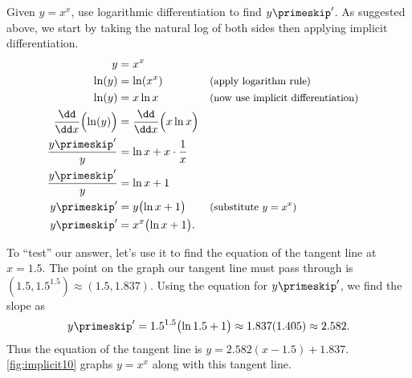 \begin{example}\label{ex_implicit10}%
Given $y=x^x$, use logarithmic differentiation to find $y\primeskip'$.
\solution
As suggested above, we start by taking the natural log of both sides then applying implicit differentiation.
\begin{align*}
y &= x^x \\
\ln (y) &= \ln (x^x) && \text{\small (apply logarithm rule)}\\
\ln (y) &= x\ln x && \text{\small (now use implicit differentiation)}\\
\frac{\dd}{\dd x}\Bigl(\ln (y)\Bigr) &= \frac{\dd}{\dd x}\Bigl(x\ln x\Bigr) \\
\frac{y\primeskip'}{y} &= \ln x + x\cdot\frac1x\\
\frac{y\primeskip'}{y} &= \ln x + 1\\
y\primeskip'
&= y\bigl(\ln x+1\bigr) && \text{\small (substitute $y=x^x$)}\\
y\primeskip' &= x^x\bigl(\ln x+1\bigr).
\end{align*} 


To ``test'' our answer, let's use it to find the equation of the tangent line at $x=1.5$. The point on the graph our tangent line must pass through is $(1.5, 1.5^{1.5}) \approx (1.5, 1.837)$. Using the equation for $y\primeskip'$, we find the slope as
\[y\primeskip' = 1.5^{1.5}\bigl(\ln 1.5+1\bigr) \approx 1.837(1.405) \approx 2.582.\]
Thus the equation of the tangent line is $y = 2.582(x-1.5)+1.837$. \autoref{fig:implicit10} graphs $y=x^x$ along with this tangent line.
\end{example}


